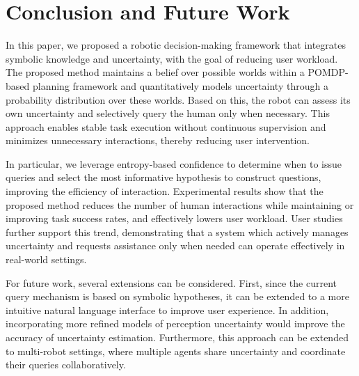 \section{Conclusion and Future Work}
In this paper, we proposed a robotic decision-making framework that integrates symbolic knowledge and uncertainty, with the goal of reducing user workload. The proposed method maintains a belief over possible worlds within a POMDP-based planning framework and quantitatively models uncertainty through a probability distribution over these worlds. Based on this, the robot can assess its own uncertainty and selectively query the human only when necessary. This approach enables stable task execution without continuous supervision and minimizes unnecessary interactions, thereby reducing user intervention.

In particular, we leverage entropy-based confidence to determine when to issue queries and select the most informative hypothesis to construct questions, improving the efficiency of interaction. Experimental results show that the proposed method reduces the number of human interactions while maintaining or improving task success rates, and effectively lowers user workload. User studies further support this trend, demonstrating that a system which actively manages uncertainty and requests assistance only when needed can operate effectively in real-world settings.

For future work, several extensions can be considered. First, since the current query mechanism is based on symbolic hypotheses, it can be extended to a more intuitive natural language interface to improve user experience. In addition, incorporating more refined models of perception uncertainty would improve the accuracy of uncertainty estimation. Furthermore, this approach can be extended to multi-robot settings, where multiple agents share uncertainty and coordinate their queries collaboratively.

